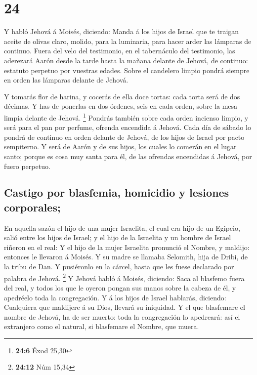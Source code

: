 \hypertarget{section-23}{%
\section{24}\label{section-23}}

 Y habló Jehová á Moisés, diciendo:  Manda á los
hijos de Israel que te traigan aceite de olivas claro, molido, para la
luminaria, para hacer arder las lámparas de continuo.  Fuera
del velo del testimonio, en el tabernáculo del testimonio, las aderezará
Aarón desde la tarde hasta la mañana delante de Jehová, de continuo:
estatuto perpetuo por vuestras edades.  Sobre el candelero
limpio pondrá siempre en orden las lámparas delante de Jehová.

 Y tomarás flor de harina, y cocerás de ella doce tortas:
cada torta será de dos décimas.  Y has de ponerlas en dos
órdenes, seis en cada orden, sobre la mesa limpia delante de Jehová.
\footnote{\textbf{24:6} Éxod 25,30}  Pondrás también sobre
cada orden incienso limpio, y será para el pan por perfume, ofrenda
encendida á Jehová.  Cada día de sábado lo pondrá de
continuo en orden delante de Jehová, de los hijos de Israel por pacto
sempiterno.  Y será de Aarón y de sus hijos, los cuales lo
comerán en el lugar santo; porque es cosa muy santa para él, de las
ofrendas encendidas á Jehová, por fuero perpetuo.

\hypertarget{castigo-por-blasfemia-homicidio-y-lesiones-corporales}{%
\subsection{Castigo por blasfemia, homicidio y lesiones
corporales;}\label{castigo-por-blasfemia-homicidio-y-lesiones-corporales}}

 En aquella sazón el hijo de una mujer Israelita, el cual
era hijo de un Egipcio, salió entre los hijos de Israel; y el hijo de la
Israelita y un hombre de Israel riñeron en el real:  Y el
hijo de la mujer Israelita pronunció el Nombre, y maldijo: entonces le
llevaron á Moisés. Y su madre se llamaba Selomith, hija de Dribi, de la
tribu de Dan.  Y pusiéronlo en la cárcel, hasta que les
fuese declarado por palabra de Jehová. \footnote{\textbf{24:12} Núm
  15,34}  Y Jehová habló á Moisés, diciendo: 
Saca al blasfemo fuera del real, y todos los que le oyeron pongan sus
manos sobre la cabeza de él, y apedréelo toda la congregación.
 Y á los hijos de Israel hablarás, diciendo: Cualquiera que
maldijere á su Dios, llevará su iniquidad.  Y el que
blasfemare el nombre de Jehová, ha de ser muerto: toda la congregación
lo apedreará: así el extranjero como el natural, si blasfemare el
Nombre, que muera.

